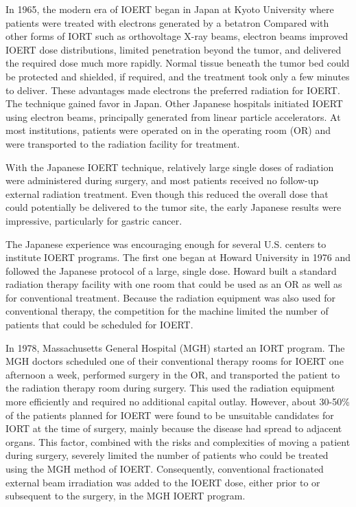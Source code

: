In 1965, the modern era of IOERT began in Japan at Kyoto University
where patients were treated with electrons generated by a betatron
Compared with other forms of IORT such as orthovoltage X-ray beams,
electron beams improved IOERT dose distributions, limited penetration
beyond the tumor, and delivered the required dose much more rapidly.
Normal tissue beneath the tumor bed could be protected and shielded, if
required, and the treatment took only a few minutes to deliver. These
advantages made electrons the preferred radiation for IOERT. The
technique gained favor in Japan. Other Japanese hospitals initiated
IOERT using electron beams, principally generated from linear particle
accelerators. At most institutions, patients were operated on in the
operating room (OR) and were transported to the radiation facility for
treatment.

With the Japanese IOERT technique, relatively large single doses of
radiation were administered during surgery, and most patients received
no follow-up external radiation treatment. Even though this reduced the
overall dose that could potentially be delivered to the tumor site, the
early Japanese results were impressive, particularly for gastric cancer.

The Japanese experience was encouraging enough for several U.S. centers
to institute IOERT programs. The first one began at Howard University in
1976 and followed the Japanese protocol of a large, single dose. Howard
built a standard radiation therapy facility with one room that could be
used as an OR as well as for conventional treatment. Because the
radiation equipment was also used for conventional therapy, the
competition for the machine limited the number of patients that could be
scheduled for IOERT.

In 1978, Massachusetts General Hospital (MGH) started an IORT program.
The MGH doctors scheduled one of their conventional therapy rooms for
IOERT one afternoon a week, performed surgery in the OR, and transported
the patient to the radiation therapy room during surgery. This used the
radiation equipment more efficiently and required no additional capital
outlay. However, about 30-50\% of the patients planned for IOERT were
found to be unsuitable candidates for IORT at the time of surgery,
mainly because the disease had spread to adjacent organs. This factor,
combined with the risks and complexities of moving a patient during
surgery, severely limited the number of patients who could be treated
using the MGH method of IOERT. Consequently, conventional fractionated
external beam irradiation was added to the IOERT dose, either prior to
or subsequent to the surgery, in the MGH IOERT program.

